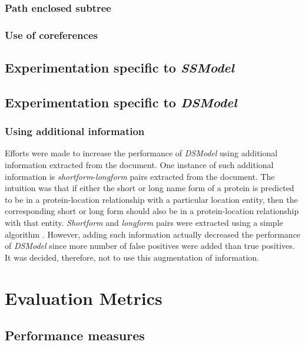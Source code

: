 \subsubsection*{Path enclosed subtree}

\subsubsection*{Use of coreferences} \label{subsubsec:coref}

\subsection{Experimentation specific to \textit{SSModel}}

\subsection{Experimentation specific to \textit{DSModel}}

\subsubsection*{Using additional information}

Efforts were made to increase the performance of \textit{DSModel} using additional information extracted from the document. One instance of such additional information is \emph{shortform}-\emph{longform} pairs extracted from the document. The intuition was that if either the short or long name form of a protein is predicted to be in a protein-location relationship with a particular location entity, then the corresponding short or long form should also be in a protein-location relationship with that entity. \emph{Shortform} and \emph{longform} pairs were extracted using a simple algorithm \cite{hearst2003simple}. However, adding such information actually decreased the performance of \textit{DSModel} since more number of false positives were added than true positives. It was decided, therefore, not to use this augmentation of information.

\section{Evaluation Metrics} \label{sec:evaluationCriteria}

\subsection{Performance measures}

